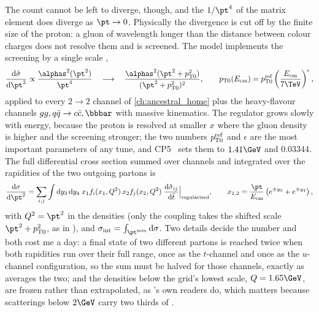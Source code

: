 The count cannot be left to diverge, though, and the $1/\pt^4$ of the
matrix element does diverge as $\pt\to0$. Physically the divergence is cut
off by the finite size of the proton: a gluon of wavelength longer than the
distance between colour charges does not resolve them and is screened. The
model implements the screening by a single scale \ptzero,
\begin{equation}
  \frac{\mathrm{d}\hat\sigma}{\mathrm{d}\pt^2}\propto
  \frac{\alphas^2(\pt^2)}{\pt^4}
  \quad\longrightarrow\quad
  \frac{\alphas^2(\pt^2+\ptzero^2)}{(\pt^2+\ptzero^2)^2},
  \qquad
  \ptzero(E_{\mathrm{cm}})=\ptzero^{\mathrm{ref}}\left(\frac{E_{\mathrm{cm}}}{7\TeV}\right)^{\epsilon},
  \label{eq:uninvited_cousins:regularised}
\end{equation}
applied to every $2\to2$ channel of \cref{ch:ancestral_home} plus the
heavy-flavour channels $gg,q\bar q\to c\bar c,\bbbar$ with massive
kinematics. The regulator grows slowly with energy, because the proton is
resolved at smaller $x$ where the gluon density is higher and the screening
stronger; the two numbers $p_{\mathrm{T}0}^{\mathrm{ref}}$ and $\epsilon$ are the
most important parameters of any tune, and CP5~\cite{CMS:2019csb} sets them
to $1.41\GeV$ and $0.03344$. The full differential cross section summed over
channels and integrated over the rapidities of the two outgoing partons is
\begin{equation}
  \frac{\mathrm{d}\sigma}{\mathrm{d}\pt^2}=\sum_{i,j}\int\mathrm{d}y_3\,\mathrm{d}y_4\;
  x_1f_i(x_1,Q^2)\,x_2f_j(x_2,Q^2)\;\frac{\mathrm{d}\hat\sigma_{ij}}{\mathrm{d}\hat t}
  \Big|_{\mathrm{regularised}},\qquad
  x_{1,2}=\frac{\pt}{E_{\mathrm{cm}}}\left(e^{\pm y_3}+e^{\pm y_4}\right),
  \label{eq:uninvited_cousins:dsigma}
\end{equation}
with $Q^2=\pt^2$ in the densities (only the coupling takes the shifted
scale $\pt^2+\ptzero^2$, as in \PYTHIA), and
$\sigint=\int_{\pt^{\min}}\mathrm{d}\sigma$. Two details decide the number
and both cost me a day: a final state of two different partons is reached
twice when both rapidities run over their full range, once as the
$t$-channel and once as the $u$-channel configuration, so the sum must be
halved for those channels, exactly as \PYTHIA averages the two; and the
densities below the grid's lowest scale, $Q=1.65\GeV$, are frozen rather
than extrapolated, as \PYTHIA's own readers do, which matters because
scatterings below $2\GeV$ carry two thirds of \sigint.

